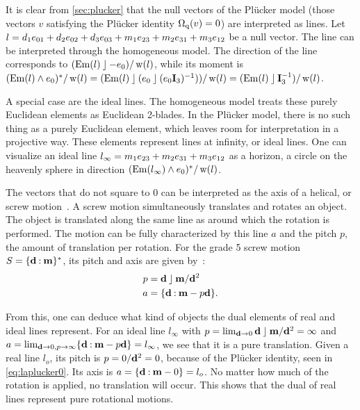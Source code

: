 It is clear from \autoref{sec:plucker} that the null vectors of the Pl\"ucker model (those vectors $v$ satisfying the Pl\"ucker identity $\operatorname{\Omega_q}(v) = 0$) are interpreted as lines.  Let $l = d_1 e_{01} + d_2 e_{02} + d_3 e_{03} + m_1 e_{23} + m_2 e_{31} + m_3 e_{12}$ be a null vector.  The line can be interpreted through the homogeneous model.  The direction of the line corresponds to $(\operatorname{Em}(l) \mathbin{\rfloor} -e_0) / \operatorname{w}(l)$, while its moment is $(\operatorname{Em}(l) \wedge e_0)^\ast / \operatorname{w}(l) = (\operatorname{Em}(l) \mathbin{\rfloor} (e_0 \mathbin{\rfloor} (e_0\mathbf{I}_3)^{-1})) / \operatorname{w}(l) = (\operatorname{Em}(l) \mathbin{\rfloor} \mathbf{I}_3^{-1}) / \operatorname{w}(l)$.  

A special case are the ideal lines.  The homogeneous model treats these purely Euclidean elements as Euclidean 2-blades.
In the Pl\"ucker model, there is no such thing as a purely Euclidean element, which leaves room for interpretation in a projective way.  These elements represent lines at infinity, or ideal lines.  One can visualize an ideal line $l_\infty = m_1 e_{23} + m_2 e_{31} + m_3 e_{12}$ as a horizon, a circle on the heavenly sphere in direction $(\operatorname{Em}(l_\infty) \wedge e_0)^\ast / \operatorname{w}(l)$.  

The vectors that do not square to $0$ can be interpreted as the axis of a helical, or screw motion~\cite[Section 3.1.2]{Pottmann}.  A screw motion simultaneously translates and rotates an object.  The object is translated along the same line as around which the rotation is performed.  The motion can be fully characterized by this line $a$ and the pitch $p$, the amount of translation per rotation.  For the grade 5 screw motion $S = \{\mathbf{d} \mathbin{:} \mathbf{m}\}^\ast$, its pitch and axis are given by~\cite[Theorem 3.1.9]{Pottmann}:
\begin{align}
  \label{eq:screwparams}
  p &= \mathbf{d} \mathbin{\rfloor} \mathbf{m} / \mathbf{d}^2 \nonumber \\
  a &= \{\mathbf{d} \mathbin{:} \mathbf{m} - p \mathbf{d}\} .
\end{align}

From this, one can deduce what kind of objects the dual elements of real and ideal lines represent.  For an ideal line $l_\infty$ with $p = \lim_{\mathbf{d} \to 0} \mathbf{d} \mathbin{\rfloor} \mathbf{m} / \mathbf{d}^2 = \infty$ and $a = \lim_{\mathbf{d} \to 0, p \to \infty} \{\mathbf{d} \mathbin{:} \mathbf{m} - p \mathbf{d}\} = l_\infty$, we see that it is a pure translation.  Given a real line $l_o$, its pitch is $p = 0 / \mathbf{d}^2 = 0$, because of the Pl\"ucker identity, seen in \autoref{eq:laplucker0}.  Its axis is $a = \{\mathbf{d} \mathbin{:} \mathbf{m} - 0\} = l_o$.  No matter how much of the rotation is applied, no translation will occur.  This shows that the dual of real lines represent pure rotational motions.
%


